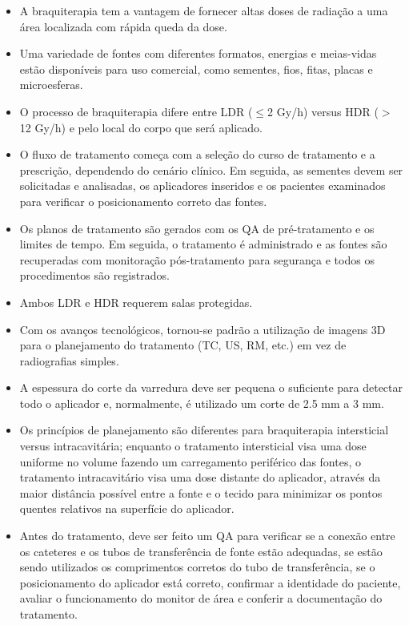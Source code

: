 \documentclass[11pt,a4paper]{article}
\newcounter{exemplo}
\begin{document}
\begin{exemplo}
	\begin{itemize}
		\item A braquiterapia tem a vantagem de fornecer altas doses de radiação a uma área localizada com rápida queda da dose. 
		\item Uma variedade de fontes com diferentes formatos, energias e meias-vidas estão disponíveis para uso comercial, como sementes, fios, fitas, placas e microesferas.
		\item  O processo de braquiterapia difere entre LDR ($\leq$2 Gy/h) versus HDR ($>$ 12 Gy/h) e pelo local do corpo que será aplicado.
		\item O fluxo de tratamento começa com a seleção do curso de tratamento e a prescrição, dependendo do cenário clínico. Em seguida, as sementes devem ser solicitadas e analisadas, os aplicadores inseridos e os pacientes examinados para verificar o posicionamento correto das fontes.
		\item Os planos de tratamento são gerados com os QA de pré-tratamento e os limites de tempo. Em seguida, o tratamento é administrado e as fontes são recuperadas com monitoração pós-tratamento para segurança e todos os procedimentos são registrados.
		\item  Ambos LDR e HDR requerem salas protegidas.
		\item Com os avanços tecnológicos, tornou-se padrão a utilização de imagens 3D para o planejamento do tratamento (TC, US, RM, etc.) em vez de radiografias simples.
		\item A espessura do corte da varredura deve ser pequena o suficiente para detectar todo o aplicador e, normalmente, é utilizado um corte de 2.5 mm a 3 mm.
		\item Os princípios de planejamento são diferentes para braquiterapia intersticial versus intracavitária; enquanto o tratamento intersticial visa uma dose uniforme no volume fazendo um carregamento periférico das fontes, o tratamento intracavitário visa uma dose distante do aplicador, através da maior distância possível entre a fonte e o tecido para minimizar os pontos quentes relativos na superfície do aplicador.
		\item Antes do tratamento, deve ser feito um QA para verificar se a conexão entre os cateteres e os tubos de transferência de fonte estão adequadas, se estão sendo utilizados os comprimentos corretos do tubo de transferência, se o posicionamento do aplicador está correto, confirmar a identidade do paciente, avaliar o funcionamento do monitor de área e conferir a documentação do tratamento.

\end{itemize}
\end{exemplo}
\end{document}
